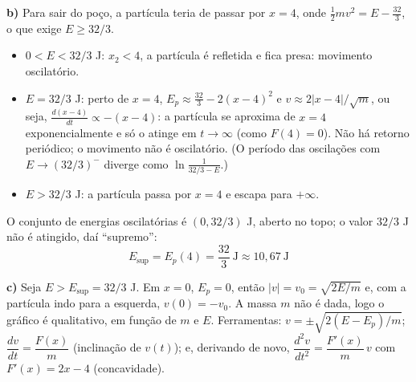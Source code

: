 \documentclass{article}%
\begin{document}
\textbf{b)} Para sair do poço, a partícula teria de passar por $x=4$, onde $\tfrac12mv^2=E-\tfrac{32}{3}$, o que exige $E\ge 32/3$.
\begin{itemize}
\item $0<E<32/3$ J: $x_2<4$, a partícula é refletida e fica presa: movimento oscilatório.
\item $E=32/3$ J: perto de $x=4$, $E_p\approx\frac{32}{3}-2(x-4)^2$ e $v\approx 2|x-4|/\sqrt m$, ou seja, $\frac{d(x-4)}{dt}\propto-(x-4)$: a partícula se aproxima de $x=4$ exponencialmente e só o atinge em $t\to\infty$ (como $F(4)=0$). Não há retorno periódico; o movimento não é oscilatório. (O período das oscilações com $E\to(32/3)^-$ diverge como $\ln\frac{1}{32/3-E}$.)
\item $E>32/3$ J: a partícula passa por $x=4$ e escapa para $+\infty$.
\end{itemize}
O conjunto de energias oscilatórias é $(0,32/3)$ J, aberto no topo; o valor $32/3$ J não é atingido, daí ``supremo'':
\[
\boxed{E_{\sup}=E_p(4)=\frac{32}{3}\ \text{J}\approx 10{,}67\ \text{J}}
\]

\textbf{c)} Seja $E>E_{\sup}=32/3$ J. Em $x=0$, $E_p=0$, então $|v|=v_0=\sqrt{2E/m}$ e, com a partícula indo para a esquerda, $v(0)=-v_0$. A massa $m$ não é dada, logo o gráfico é qualitativo, em função de $m$ e $E$. Ferramentas: $v=\pm\sqrt{2(E-E_p)/m}$; $\dfrac{dv}{dt}=\dfrac{F(x)}{m}$ (inclinação de $v(t)$); e, derivando de novo, $\dfrac{d^2v}{dt^2}=\dfrac{F'(x)}{m}\,v$ com $F'(x)=2x-4$ (concavidade).
\end{document}

